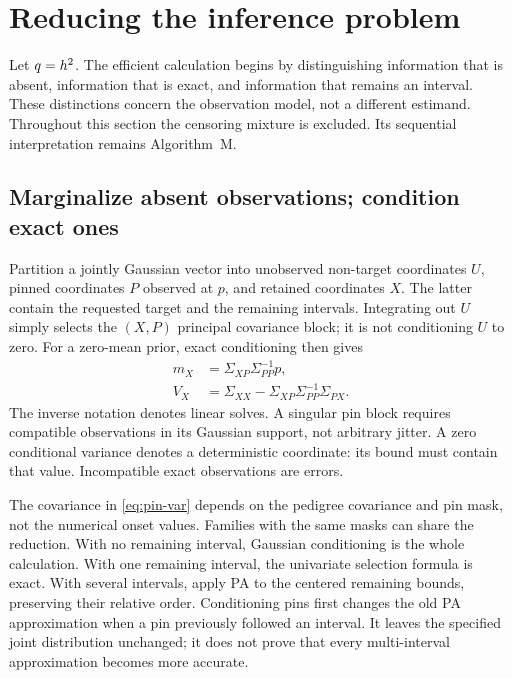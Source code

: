 \section{Reducing the inference problem}
\label{sec:reduction}

Let $q=h^{2}$. The efficient calculation begins by distinguishing information
that is absent, information that is exact, and information that remains an
interval. These distinctions concern the observation model, not a different
estimand. Throughout this section the censoring mixture is excluded. Its
sequential interpretation remains Algorithm~M.

\subsection{Marginalize absent observations; condition exact ones}

Partition a jointly Gaussian vector into unobserved non-target coordinates
$U$, pinned coordinates $P$ observed at $p$, and retained coordinates $X$.
The latter contain the requested target and the remaining intervals.
Integrating out $U$ simply selects the $(X,P)$ principal covariance block;
it is not conditioning $U$ to zero. For a zero-mean prior, exact conditioning
then gives
\begin{align}
 m_X &= \Sigma_{XP}\Sigma_{PP}^{-1}p,\label{eq:pin-mean}\\
 V_X &= \Sigma_{XX}-\Sigma_{XP}\Sigma_{PP}^{-1}\Sigma_{PX}.
 \label{eq:pin-var}
\end{align}
The inverse notation denotes linear solves. A singular pin block requires
compatible observations in its Gaussian support, not arbitrary jitter.
A zero conditional variance denotes a deterministic coordinate: its bound
must contain that value. Incompatible exact observations are errors.

The covariance in \eqref{eq:pin-var} depends on the pedigree covariance and
pin mask, not the numerical onset values. Families with the same masks can
share the reduction. With no remaining interval, Gaussian conditioning is
the whole calculation. With one remaining interval, the univariate selection
formula is exact. With several intervals, apply PA to the centered remaining
bounds, preserving their relative order. Conditioning pins first changes the
old PA approximation when a pin previously followed an interval. It leaves
the specified joint distribution unchanged; it does not prove that every
multi-interval approximation becomes more accurate.

